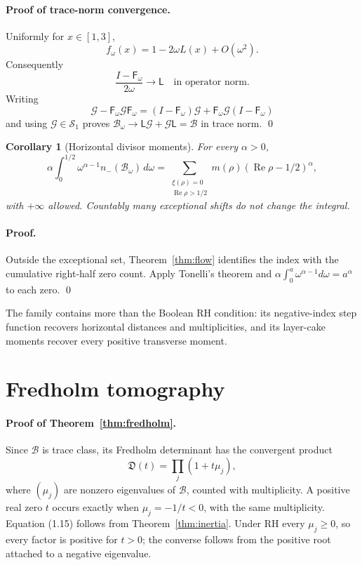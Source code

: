 \documentclass[11pt]{article}
\newtheorem{corollary}[theorem]{Corollary}
\theoremstyle{definition}
\theoremstyle{remark}
\newcommand{\cB}{\mathcal B}
\newcommand{\cG}{\mathcal G}
\newcommand{\cS}{\mathcal S}
\newcommand{\nm}{n_{-}}
\newcommand{\Rea}{\operatorname{Re}}
\begin{document}
\paragraph{Proof of trace-norm convergence.}
Uniformly for $x\in[1,3]$,
\begin{equation}
 f_\omega(x)=1-2\omega L(x)+O(\omega^2).                   \tag{6.4}
\end{equation}
Consequently
\[
 \frac{I-\mathsf F_\omega}{2\omega}\longrightarrow\mathsf L
\quad\text{in operator norm}.
\]
Writing
\[
 \cG-\mathsf F_\omega\cG\mathsf F_\omega
 =(I-\mathsf F_\omega)\cG
 +\mathsf F_\omega\cG(I-\mathsf F_\omega)
\]
and using $\cG\in\cS_1$ proves $\cB_\omega\to
\mathsf L\cG+\cG\mathsf L=\cB$ in trace norm. \qed

\begin{corollary}[Horizontal divisor moments]
\label{cor:moments}
For every $\alpha>0$,
\begin{equation}
 \alpha\int_0^{1/2}\omega^{\alpha-1}\nm(\cB_\omega)\,d\omega
 =\sum_{\substack{\xi(\rho)=0\\\Rea\rho>1/2}}
   m(\rho)(\Rea\rho-1/2)^\alpha,                           \tag{6.5}
\end{equation}
with $+\infty$ allowed.  Countably many exceptional shifts do not change the integral.
\end{corollary}

\paragraph{Proof.}
Outside the exceptional set, Theorem~\ref{thm:flow} identifies the index with the cumulative
right-half zero count.  Apply Tonelli's theorem and
$\alpha\int_0^a\omega^{\alpha-1}d\omega=a^\alpha$ to each zero. \qed

The family contains more than the Boolean RH condition: its negative-index step function recovers
horizontal distances and multiplicities, and its layer-cake moments recover every positive
transverse moment.

\section{Fredholm tomography}
\label{sec:fredholm}

\paragraph{Proof of Theorem~\ref{thm:fredholm}.}
Since $\cB$ is trace class, its Fredholm determinant has the convergent product
\begin{equation}
 \mathfrak D(t)=\prod_j(1+t\mu_j),                          \tag{7.1}
\end{equation}
where $(\mu_j)$ are nonzero eigenvalues of $\cB$, counted with multiplicity.  A positive real zero
$t$ occurs exactly when $\mu_j=-1/t<0$, with the same multiplicity.  Equation (1.15) follows from
Theorem~\ref{thm:inertia}.  Under RH every $\mu_j\geq0$, so every factor is positive for $t>0$;
the converse follows from the positive root attached to a negative eigenvalue.
\end{document}
